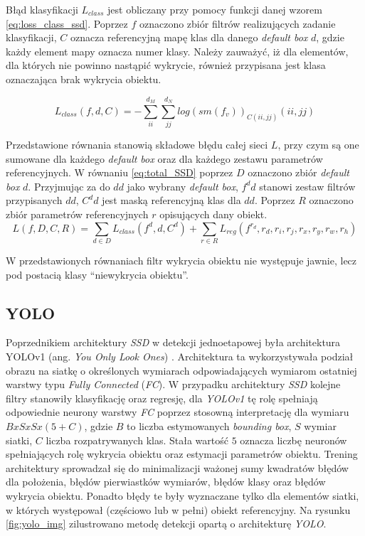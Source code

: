 Błąd klasyfikacji $L_{class}$ jest obliczany przy pomocy funkcji danej wzorem \eqref{eq:loss_class_ssd}. Poprzez $f$ oznaczono zbiór filtrów realizujących zadanie klasyfikacji, $C$ oznacza referencyjną mapę klas dla danego \emph{default box} $d$, gdzie każdy element mapy oznacza numer klasy. Należy zauważyć, iż dla elementów, dla których nie powinno nastąpić wykrycie, również przypisana jest klasa oznaczająca brak wykrycia obiektu.

\begin{equation}
L_{class}(f,d,C) = 
-\sum_{ii}^{d_M}{\sum_{jj}^{d_N}
{log(sm(f_{v}))_{C(ii,jj)}(ii,jj)}
}
\label{eq:loss_class_ssd}
\end{equation}


Przedstawione równania stanowią składowe błędu całej sieci $L$, przy czym są one sumowane dla każdego \emph{default box} oraz dla każdego zestawu parametrów referencyjnych.
W równaniu \eqref{eq:total_SSD} poprzez $D$ oznaczono zbiór \emph{default box} $d$. 
Przyjmując za do $dd$ jako wybrany \emph{default box},  $f^dd$ stanowi zestaw filtrów przypisanych $dd$, $C^dd$ jest maską referencyjną klas dla $dd$. 
Poprzez $R$ oznaczono zbiór parametrów referencyjnych $r$ opisujących dany obiekt.
\begin{equation}
    L(f, D, C, R) = \sum_{d \in D} {L_{class}(f^d,d,C^d)} + \sum_{r \in R}{L_{reg}(f^{r_d},r_d,r_i,r_j,r_x,r_y,r_w,r_h)}
\label{eq:total_SSD}
\end{equation}

W przedstawionych równaniach filtr wykrycia obiektu nie występuje jawnie, lecz pod postacią klasy ``niewykrycia obiektu''.


\subsection{YOLO}
\label{ch:yolo}
Poprzednikiem architektury \emph{SSD} w detekcji jednoetapowej była architektura YOLOv1 (ang. \emph{You Only Look Ones}) \cite{yolov1}.
Architektura ta wykorzystywała podział obrazu na siatkę o określonych wymiarach odpowiadających wymiarom ostatniej warstwy typu \emph{Fully Connected} (\emph{FC}).
W przypadku architektury \emph{SSD} kolejne filtry stanowiły klasyfikację oraz regresję, 
dla \emph{YOLOv1} tę rolę spełniają odpowiednie neurony warstwy \emph{FC} poprzez stosowną interpretację dla wymiaru $BxSxSx(5+C)$, gdzie $B$ to liczba estymowanych \emph{bounding box}, $S$ wymiar siatki, $C$ liczba rozpatrywanych klas. 
Stała wartość $5$ oznacza liczbę neuronów spełniających rolę wykrycia obiektu oraz estymacji parametrów obiektu.
Trening architektury sprowadzał się do minimalizacji ważonej sumy kwadratów błędów dla położenia, błędów pierwiastków wymiarów, błędów klasy oraz błędów wykrycia obiektu. 
Ponadto błędy te były wyznaczane tylko dla elementów siatki, w których występował (częściowo lub w pełni) obiekt referencyjny.
Na rysunku \ref{fig:yolo_img} zilustrowano metodę detekcji opartą o architekturę \emph{YOLO}.

